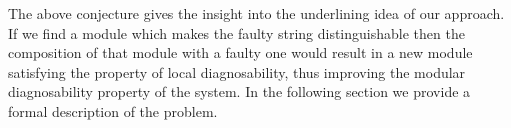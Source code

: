 The above conjecture gives the insight into the underlining idea of our
approach. If we find a module which makes the faulty string distinguishable
then the composition of that module with a faulty one would result in a new
module satisfying the property of local diagnosability, thus improving
the modular diagnosability property of the system. In the following section we
provide a formal description of the problem.


